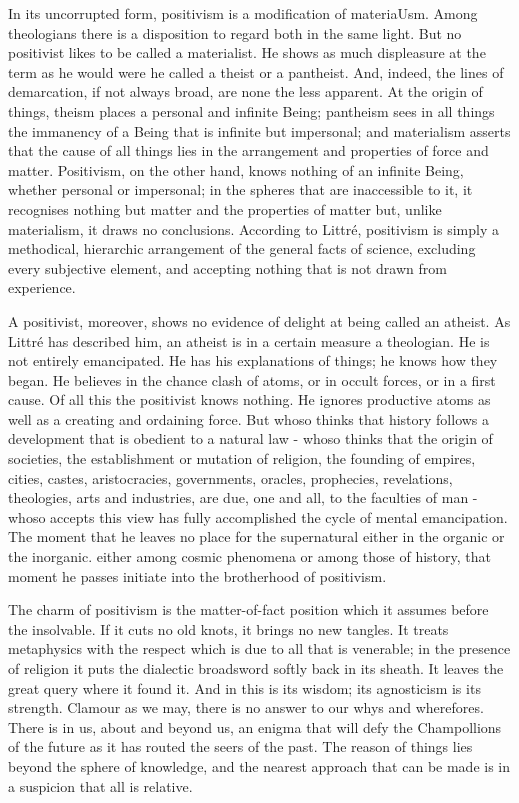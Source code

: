 \documentclass[]{book}
\begin{document}
In its uncorrupted form, positivism is a modification of materiaUsm.
Among theologians there is a disposition to regard both in the same
light. But no positivist likes to be called a materialist. He shows as
much displeasure at the term as he would were he called a theist or a
pantheist. And, indeed, the lines of demarcation, if not always broad,
are none the less apparent. At the origin of things, theism places a
personal and infinite Being; pantheism sees in all things the immanency
of a Being that is infinite but impersonal; and materialism asserts that
the cause of all things lies in the arrangement and properties of force
and matter. Positivism, on the other hand, knows nothing of an infinite
Being, whether personal or impersonal; in the spheres that are
inaccessible to it, it recognises nothing but matter and the properties
of matter but, unlike materialism, it draws no conclusions. According to
Littré, positivism is simply a methodical, hierarchic arrangement of the
general facts of science, excluding every subjective element, and
accepting nothing that is not drawn from experience.

A positivist, moreover, shows no evidence of delight at being called an
atheist. As Littré has described him, an atheist is in a certain measure
a theologian. He is not entirely emancipated. He has his explanations of
things; he knows how they began. He believes in the chance clash of
atoms, or in occult forces, or in a first cause. Of all this the
positivist knows nothing. He ignores productive atoms as well as a
creating and ordaining force. But whoso thinks that history follows a
development that is obedient to a natural law - whoso thinks that the
origin of societies, the establishment or mutation of religion, the
founding of empires, cities, castes, aristocracies, governments,
oracles, prophecies, revelations, theologies, arts and industries, are
due, one and all, to the faculties of man - whoso accepts this view has
fully accomplished the cycle of mental emancipation. The moment that he
leaves no place for the supernatural either in the organic or the
inorganic. either among cosmic phenomena or among those of history, that
moment he passes initiate into the brotherhood of positivism.

The charm of positivism is the matter-of-fact position which it assumes
before the insolvable. If it cuts no old knots, it brings no new
tangles. It treats metaphysics with the respect which is due to all that
is venerable; in the presence of religion it puts the dialectic
broadsword softly back in its sheath. It leaves the great query where it
found it. And in this is its wisdom; its agnosticism is its strength.
Clamour as we may, there is no answer to our whys and wherefores. There
is in us, about and beyond us, an enigma that will defy the Champollions
of the future as it has routed the seers of the past. The reason of
things lies beyond the sphere of knowledge, and the nearest approach
that can be made is in a suspicion that all is relative.
\end{document}
